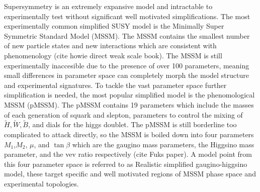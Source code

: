 Supersymmetry is an extremely expansive model and intractable to experimentally test without significant well motivated simplifications. The most experimentally common simplified SUSY model is the Minimally Super Symmetric Standard Model (MSSM). The MSSM contains the smallest number of new particle states and new interactions which are consistent with phenomenology (cite howie direct weak scale book). The MSSM is still experimentally inaccesible due to the presence of over 100 parameters, meaning small differences in parameter space can completely morph the model structure and experimental signatures. To tackle the vast parameter space further simplification is needed, the most popular simplified model is the phenomological MSSM (pMSSM). The pMSSM contains 19 parameters which include the masses of each generation of squark and slepton, parameters to control the mixing of $\tilde{H}, \tilde{W}, \tilde{B}$, and dials for the higgs doublet.  The pMSSM is still borderline too complicated to attack directly, so the MSSM is boiled down into four parameters $M_1$,$M_2$, $\mu$, and $\tan\beta$ which are the gaugino mass parameters, the Higgsino mass parameter, and the vev ratio respectively (cite Fuks paper).  A model point from this four parameter space is referred to as Realistic simplified gaugino-higgsino model, these target specific and well motivated regions of MSSM phase space and experimental topologies.

